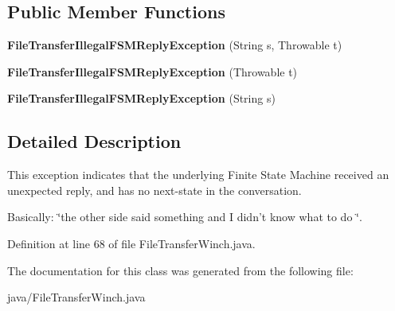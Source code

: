 \subsection*{Public Member Functions}
\begin{DoxyCompactItemize}
\item 
{\bfseries File\+Transfer\+Illegal\+F\+S\+M\+Reply\+Exception} (String s, Throwable t)\label{classorg_1_1smallfoot_1_1filexfer_1_1FileTransferWinch_1_1FileTransferIllegalFSMReplyException_ad27ca86ec85b2c39c339bdaf0eee3560}

\item 
{\bfseries File\+Transfer\+Illegal\+F\+S\+M\+Reply\+Exception} (Throwable t)\label{classorg_1_1smallfoot_1_1filexfer_1_1FileTransferWinch_1_1FileTransferIllegalFSMReplyException_a4e8ffe04c5de02a5750e97613ef40af8}

\item 
{\bfseries File\+Transfer\+Illegal\+F\+S\+M\+Reply\+Exception} (String s)\label{classorg_1_1smallfoot_1_1filexfer_1_1FileTransferWinch_1_1FileTransferIllegalFSMReplyException_a2e552ceb66966a3493c3c47227d5ba6c}

\end{DoxyCompactItemize}


\subsection{Detailed Description}
This exception indicates that the underlying Finite State Machine received an unexpected reply, and has no next-\/state in the conversation. 

Basically\+: \char`\"{}the other side said something and I didn't know what to do \char`\"{}. 

Definition at line 68 of file File\+Transfer\+Winch.\+java.



The documentation for this class was generated from the following file\+:\begin{DoxyCompactItemize}
\item 
java/File\+Transfer\+Winch.\+java\end{DoxyCompactItemize}
